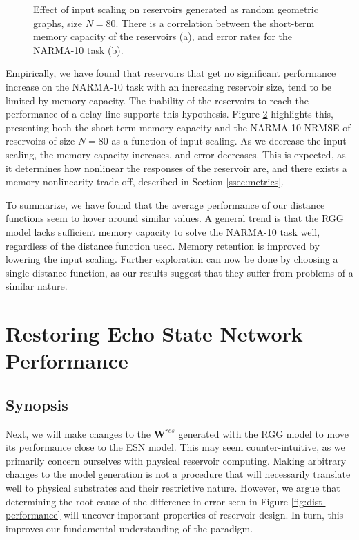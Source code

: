 \begin{figure}[htb]
\begin{subfigure}{.49\textwidth}
    \caption{}
    \label{fig:dist-performance-is-b}
  \end{subfigure}
  \caption{
    Effect of input scaling on reservoirs generated as random geometric graphs,
size $N = 80$. There is a correlation between the short-term memory capacity of
the reservoirs (a), and error rates for the NARMA-10 task (b).
  }
  \label{fig:dist-performance-is}
\end{figure}

Empirically, we have found that reservoirs that get no significant performance
increase on the NARMA-10 task with an increasing reservoir size, tend to be
limited by memory capacity. The inability of the reservoirs to reach the
performance of a delay line supports this hypothesis. Figure
\ref{fig:dist-performance-is} highlights this, presenting both the short-term
memory capacity and the NARMA-10 NRMSE of reservoirs of size $N = 80$ as a
function of input scaling. As we decrease the input scaling, the memory capacity
increases, and error decreases. This is expected, as it determines how nonlinear
the responses of the reservoir are, and there exists a memory-nonlinearity
trade-off, described in Section \ref{ssec:metrics}.

To summarize, we have found that the average performance of our distance
functions seem to hover around similar values. A general trend is that the RGG
model lacks sufficient memory capacity to solve the NARMA-10 task well,
regardless of the distance function used. Memory retention is improved by
lowering the input scaling. Further exploration can now be done by choosing a
single distance function, as our results suggest that they suffer from problems
of a similar nature.

\section{Restoring Echo State Network Performance}
\label{sec:restore}

\subsection{Synopsis}

Next, we will make changes to the $\mathbf{W}^{res}$ generated with the RGG
model to move its performance close to the ESN model. This may seem
counter-intuitive, as we primarily concern ourselves with physical reservoir
computing. Making arbitrary changes to the model generation is not a procedure
that will necessarily translate well to physical substrates and their
restrictive nature. However, we argue that determining the root cause of the
difference in error seen in Figure \ref{fig:dist-performance} will uncover
important properties of reservoir design. In turn, this improves our fundamental
understanding of the paradigm.

